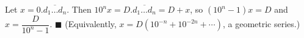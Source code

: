 Let $x=0.\overline{d_1\dots d_n}$. Then $10^nx=D.\overline{d_1\dots d_n}=D+x$, so $(10^n-1)x=D$ and $x=\dfrac D{10^n-1}$. $\blacksquare$ (Equivalently, $x=D\left(10^{-n}+10^{-2n}+\cdots\right)$, a geometric series.)
